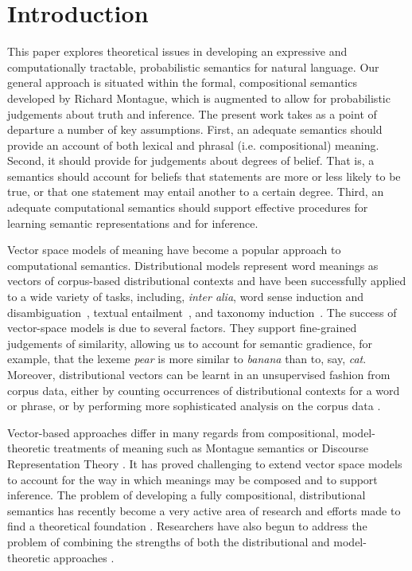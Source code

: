 \documentclass[a4paper,11pt]{article}
\renewcommand{\cite}{\citep}
\theoremstyle{definition}
\begin{document}
\section{Introduction}

This paper explores theoretical  issues in developing an expressive and computationally tractable, probabilistic semantics for natural language.  Our general approach is situated within the formal, compositional semantics developed by Richard Montague, which is augmented to allow for probabilistic judgements about truth and inference. The present work takes  as a point of departure a number of key assumptions.
First, an adequate semantics should provide an account of both lexical and phrasal (i.e. compositional) meaning. Second, it should provide for judgements about degrees of belief. That is, a semantics should account for beliefs that statements are more or less likely to be true, or that one statement may entail another to a certain degree. Third, an adequate computational semantics should support effective procedures for learning semantic representations and for inference.

Vector space models of meaning have become a popular approach to computational semantics.
Distributional models represent word meanings as vectors of corpus-based distributional contexts and have been successfully applied to a wide variety of tasks, including, {\em inter alia\/}, word sense induction and disambiguation~\cite{khapra-EtAl:2010:ACL,Baskaya:13}, 
textual entailment~\cite{Marelli:14}, 
and taxonomy induction~\cite{fountain-lapata:2012:NAACL-HLT}. 
The success of vector-space models is due to several factors. They support fine-grained judgements of similarity, allowing us to account for semantic gradience, for example, that the lexeme {\em pear} is more similar to {\em banana}  than to, say, {\em cat}. Moreover, distributional vectors can be learnt in an unsupervised fashion from corpus data, either by counting occurrences of distributional contexts for a word or phrase, or by performing more sophisticated analysis on the corpus data \cite{Mikolov:13,Pennington:14}. 

Vector-based approaches differ in many regards from compositional, model-theoretic treatments of meaning such as Montague semantics or Discourse Representation Theory \cite{Kamp:93}. It has proved challenging to extend vector space models to account for the way in which meanings may be composed and to support inference. The problem of developing a fully compositional, distributional semantics has recently become a very active area of research  \cite{Widdows:08,Mitchell:08,Baroni2010,Garrette:11,Grefenstette:11,Socher:12,Lewis:13} and efforts made to find a theoretical foundation \cite{Clarke:12,Kartsaklis:14}.  Researchers have also begun to address the problem of combining the strengths of both the distributional and model-theoretic approaches \cite{Clarke:07,Coecke:10,Garrette:11,Lewis:13}. 
\end{document}
